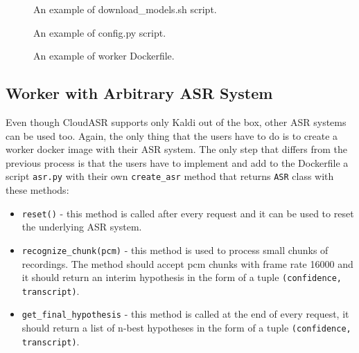 \begin{figure}[h]
  

  \caption{An example of download\_models.sh script.}
  \label{fig:download-models}
\end{figure}

\begin{figure}[h]
  

  \caption{An example of config.py script.}
  \label{fig:config-py}
\end{figure}

\begin{figure}[h]
  

  \caption{An example of worker Dockerfile.}
  \label{fig:worker-dockerfile}
\end{figure}


\subsection{Worker with Arbitrary ASR System}
Even though CloudASR supports only Kaldi out of the box, other ASR systems can be used too.
Again, the only thing that the users have to do is to create a worker docker image with their ASR system.
The only step that differs from the previous process is
  that the users have to implement and add to the Dockerfile a script \texttt{asr.py} with their own \texttt{create\_asr} method
  that returns \texttt{ASR} class with these methods:

\begin{itemize}
  \item
    \texttt{reset()} - this method is called after every request
      and it can be used to reset the underlying ASR system.

  \item
    \texttt{recognize\_chunk(pcm)} - this method is used to process small chunks of recordings.
      The method should accept pcm chunks with frame rate 16000
        and it should return an interim hypothesis in the form of a tuple \texttt{(confidence, transcript)}.

  \item
    \texttt{get\_final\_hypothesis} - this method is called at the end of every request,
      it should return a list of n-best hypotheses in the form of a tuple \texttt{(confidence, transcript)}.

\end{itemize}

